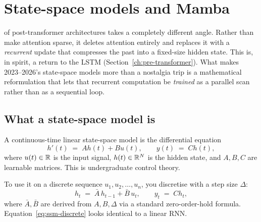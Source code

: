 \section{State-space models and Mamba}
\label{ch:ssm}

 of post-transformer architectures
takes a completely different angle. Rather than make attention sparse, it
deletes attention entirely and replaces it with a \emph{recurrent} update
that compresses the past into a fixed-size hidden state. This is, in
spirit, a return to the LSTM (Section~\ref{ch:pre-transformer}). What
makes 2023--2026's state-space models more than a nostalgia trip is a
mathematical reformulation that lets that recurrent computation be
\emph{trained} as a parallel scan rather than as a sequential loop.

\subsection{What a state-space model is}

A continuous-time linear state-space model is the differential equation
\begin{equation}
  h'(t) \;=\; A h(t) + B u(t), \qquad y(t) \;=\; C h(t),
  \label{eq:ssm-continuous}
\end{equation}
where \(u(t) \in \mathbb{R}\) is the input signal, \(h(t) \in \mathbb{R}^{N}\) is the
hidden state, and \(A, B, C\) are learnable matrices. This is undergraduate
control theory.

To use it on a discrete sequence \(u_1, u_2, \ldots, u_n\), you discretise
with a step size \(\Delta\):
\begin{equation}
  h_t \;=\; \bar A\, h_{t-1} + \bar B\, u_t, \qquad y_t \;=\; C h_t,
  \label{eq:ssm-discrete}
\end{equation}
where \(\bar A, \bar B\) are derived from \(A, B, \Delta\) via a standard
zero-order-hold formula. Equation~\eqref{eq:ssm-discrete} looks identical
to a linear RNN.

